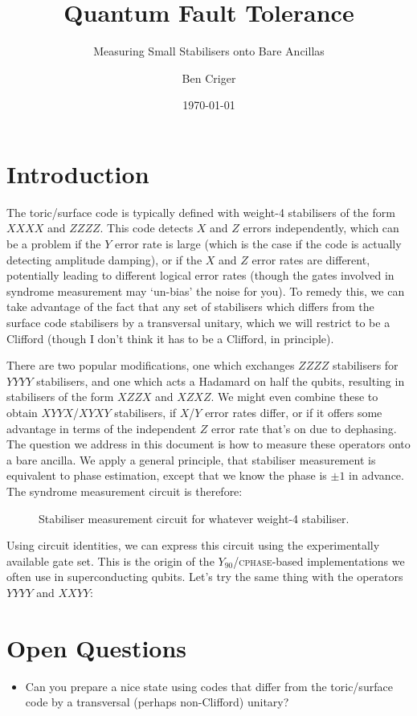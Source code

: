\documentclass[a4paper, english]{scrartcl}
\title{Quantum Fault Tolerance}
\subtitle{Measuring Small Stabilisers onto Bare Ancillas}
\author{Ben Criger}
\date{\today}
\begin{document}
\maketitle
\section{Introduction}
The toric/surface code is typically defined with weight-4 stabilisers of the form $XXXX$ and $ZZZZ$. 
This code detects $X$ and $Z$ errors independently, which can be a problem if the $Y$ error rate is large (which is the case if the code is actually detecting amplitude damping), or if the $X$ and $Z$ error rates are different, potentially leading to different logical error rates (though the gates involved in syndrome measurement may `un-bias' the noise for you). 
To remedy this, we can take advantage of the fact that any set of stabilisers which differs from the surface code stabilisers by a transversal unitary, which we will restrict to be a Clifford (though I don't think it has to be a Clifford, in principle).

There are two popular modifications, one which exchanges $ZZZZ$ stabilisers for $YYYY$ stabilisers, and one which acts a Hadamard on half the qubits, resulting in stabilisers of the form $XZZX$ and $XZXZ$.
We might even combine these to obtain $XYYX$/$XYXY$ stabilisers, if $X$/$Y$ error rates differ, or if it offers some advantage in terms of the independent $Z$ error rate that's on due to dephasing. 
The question we address in this document is how to measure these operators onto a bare ancilla. 
We apply a general principle, that stabiliser measurement is equivalent to phase estimation, except that we know the phase is $\pm 1$ in advance.
The syndrome measurement circuit is therefore: 
\begin{figure}[!h]
\centering

\caption{Stabiliser measurement circuit for whatever weight-4 stabiliser.}
\end{figure}

Using circuit identities, we can express this circuit using the experimentally available gate set.
This is the origin of the $Y_{90}$/\textsc{cphase}-based implementations we often use in superconducting qubits. 
Let's try the same thing with the operators $YYYY$ and $XXYY$:

\section{Open Questions}
\begin{itemize}
\item Can you prepare a nice state using codes that differ from the toric/surface code by a transversal (perhaps non-Clifford) unitary?
\end{itemize}
\end{document}
